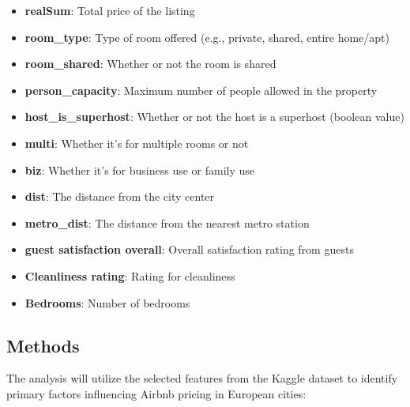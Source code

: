 \documentclass[12pt, letterpaper]{article}
\begin{document}
\begin{itemize}
  \item \textbf{realSum}: Total price of the listing
  \item \textbf{room\_type}: Type of room offered (e.g., private, shared, entire home/apt)
  \item \textbf{room\_shared}: Whether or not the room is shared
  \item \textbf{person\_capacity}: Maximum number of people allowed in the property
  \item \textbf{host\_is\_superhost}: Whether or not the host is a superhost (boolean value)
  \item \textbf{multi}: Whether it's for multiple rooms or not
  \item \textbf{biz}: Whether it's for business use or family use
  \item \textbf{dist}: The distance from the city center
  \item \textbf{metro\_dist}: The distance from the nearest metro station
  \item \textbf{guest satisfaction overall}: Overall satisfaction rating from guests
  \item \textbf{Cleanliness rating}: Rating for cleanliness
  \item \textbf{Bedrooms}: Number of bedrooms
\end{itemize}

\subsection*{Methods}
The analysis will utilize the selected features from the Kaggle dataset to identify primary factors influencing Airbnb pricing in European cities:
\end{document}

